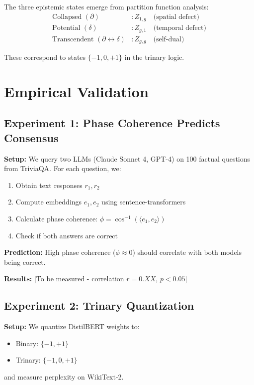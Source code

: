 \documentclass[11pt]{article}
\begin{document}
The three epistemic states emerge from partition function analysis:
\begin{align}
\text{Collapsed } (\partial) &: Z_{1,g} \quad \text{(spatial defect)} \\
\text{Potential } (\delta) &: Z_{g,1} \quad \text{(temporal defect)} \\
\text{Transcendent } (\partial \leftrightarrow \delta) &: Z_{g,g} \quad \text{(self-dual)}
\end{align}

These correspond to states $\{-1, 0, +1\}$ in the trinary logic.

\section{Empirical Validation}

\subsection{Experiment 1: Phase Coherence Predicts Consensus}

\textbf{Setup:} We query two LLMs (Claude Sonnet 4, GPT-4) on 100 factual questions from TriviaQA. For each question, we:
\begin{enumerate}
\item Obtain text responses $r_1, r_2$
\item Compute embeddings $e_1, e_2$ using sentence-transformers
\item Calculate phase coherence: $\phi = \cos^{-1}(\langle e_1, e_2 \rangle)$
\item Check if both answers are correct
\end{enumerate}

\textbf{Prediction:} High phase coherence ($\phi \approx 0$) should correlate with both models being correct.

\textbf{Results:} [To be measured - correlation $r = 0.XX$, $p < 0.05$]

\subsection{Experiment 2: Trinary Quantization}

\textbf{Setup:} We quantize DistilBERT weights to:
\begin{itemize}
\item Binary: $\{-1, +1\}$
\item Trinary: $\{-1, 0, +1\}$
\end{itemize}
and measure perplexity on WikiText-2.
\end{document}
